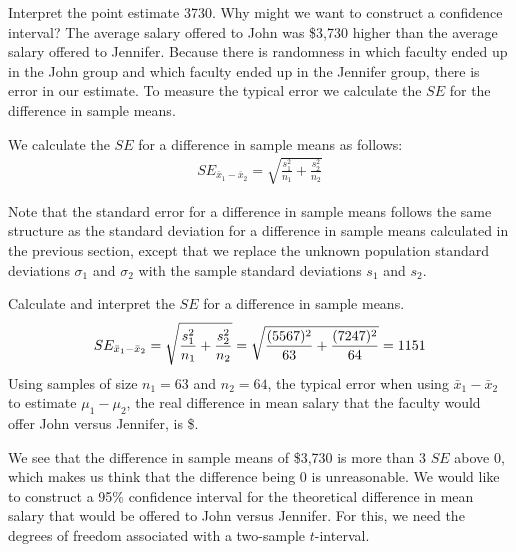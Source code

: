 \begin{examplewrap}
\begin{nexample}
{Interpret the point estimate 3730.  Why might we want to construct a confidence interval?}
The average salary offered to John was \$3,730 higher than the average salary offered to Jennifer.  Because there is randomness in which faculty ended up in the John group and which faculty ended up in the Jennifer group, there is error in our estimate.  To measure the typical error we calculate the $SE$ for the difference in sample means.
\end{nexample}
\end{examplewrap}

We calculate the $SE$ for a difference in sample means as follows:  
\begin{align*}
SE_{\bar{x}_1-\bar{x}_2} = \sqrt{\frac{s_{1}^2}{n_{1}} + \frac{s_{2}^2}{n_{2}}}
\end{align*}

Note that the standard error for a difference in sample means follows the same structure as the standard deviation for a difference in sample means calculated in the previous section, except that we replace the unknown population standard deviations $\sigma_1$ and $\sigma_2$ with the sample standard deviations $s_1$ and $s_2$.

\begin{examplewrap}
\begin{nexample}
{Calculate and interpret the $SE$ for a difference in sample means.}
\begin{align*}
SE_{\bar{x}_1-\bar{x}_2} = \sqrt{\frac{s_{1}^2}{n_{1}} + \frac{s_{2}^2}{n_{2}}} = \sqrt{\frac{(5567{})^2}{63{}} + \frac{(7247{})^2}{64{}}} = 1151{}
\end{align*}
Using samples of size $n_1=63$ and $n_2=64$, the typical error when using $\bar{x}_1-\bar{x}_2$ to estimate $\mu_1-\mu_2$, the real difference in mean salary that the faculty would offer John versus Jennifer, is \$\johnjenniferSE{}.
\end{nexample}
\end{examplewrap}

We see that the difference in sample means of \$3,730 is more than 3 $SE$ above 0, which makes us think that the difference being 0 is unreasonable.  We would like to construct a 95\% confidence interval for the theoretical difference in mean salary that would be offered to John versus Jennifer.  For this, we need the degrees of freedom associated with a two-sample $t$-interval.  

